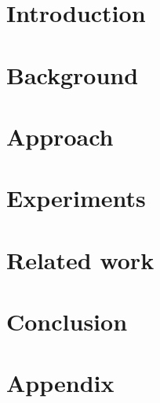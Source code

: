 \documentclass[headsepline,footsepline,oneside,fontsize=11pt,paper=a4,listof=totoc,bibliography=totoc,BCOR=12mm,DIV=13]{scrbook} %
\begin{document}

\mainmatter{}

\chapter{Introduction}


\chapter{Background}
\label{ch:background}



\chapter{Approach}
\label{ch:approach}



\chapter{Experiments}
\label{ch:experiments}


\chapter{Related work}



\chapter{Conclusion}




\newpage
\appendix
\chapter{Appendix}

\end{document}
